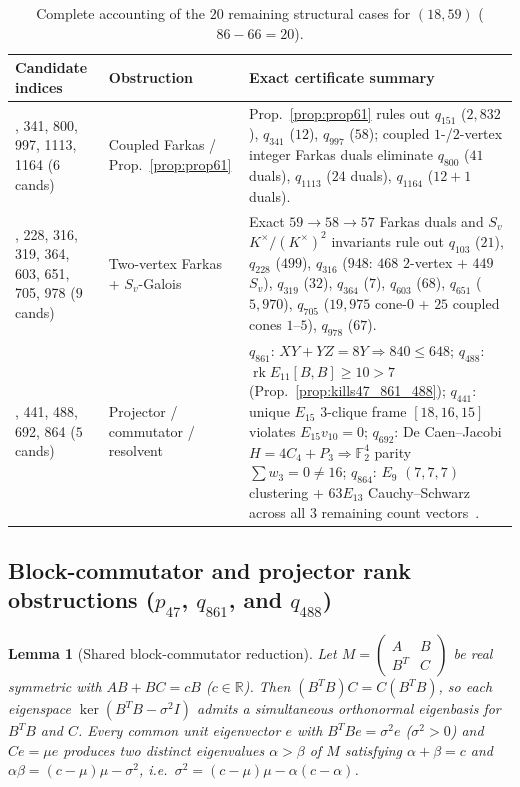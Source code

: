 \documentclass[11pt,reqno]{amsart}
\newtheorem{lemma}[theorem]{Lemma}
\theoremstyle{definition}
\theoremstyle{remark}
\DeclareMathOperator{\rk}{rk}
\begin{document}
\begin{table}[htbp]
\centering
\caption{Complete accounting of the $20$ remaining structural cases for $(18, 59)$ ($86 - 66 = 20$).}\label{tab:surv18_59}
\scriptsize
\setlength{\tabcolsep}{3.5pt}
\begin{tabular}{@{}>{\raggedright\arraybackslash}p{1.25in}>{\raggedright\arraybackslash}p{1.15in}>{\raggedright\arraybackslash}p{3.45in}@{}}
\toprule
Candidate indices & Obstruction & Exact certificate summary \\
\midrule
151, 341, 800, 997, 1113, 1164 ($6$ cands) & Coupled Farkas / Prop.~\ref{prop:prop61} & Prop.~\ref{prop:prop61} rules out $q_{151}$ ($2{,}832$), $q_{341}$ ($12$), $q_{997}$ ($58$); coupled $1$-/$2$-vertex integer Farkas duals eliminate $q_{800}$ ($41$ duals), $q_{1113}$ ($24$ duals), $q_{1164}$ ($12+1$ duals). \\
103, 228, 316, 319, 364, 603, 651, 705, 978 ($9$ cands) & Two-vertex Farkas + $S_v$-Galois & Exact $59 \to 58 \to 57$ Farkas duals and $S_v$ $K^\times/(K^\times)^2$ invariants rule out $q_{103}$ ($21$), $q_{228}$ ($499$), $q_{316}$ ($948$: $468$ $2$-vertex + $449$ $S_v$), $q_{319}$ ($32$), $q_{364}$ ($7$), $q_{603}$ ($68$), $q_{651}$ ($5{,}970$), $q_{705}$ ($19{,}975$ cone-$0$ + $25$ coupled cones $1$--$5$), $q_{978}$ ($67$). \\
861, 441, 488, 692, 864 ($5$ cands) & Projector / commutator / resolvent & $q_{861}$: $XY+YZ=8Y \Rightarrow 840 \le 648$; $q_{488}$: $\rk E_{11}[B,B] \ge 10 > 7$ (Prop.~\ref{prop:kills47_861_488}); $q_{441}$: unique $E_{15}$ $3$-clique frame $[18,16,15]$ violates $E_{15}v_{10}=0$; $q_{692}$: De Caen--Jacobi $H = 4C_4+P_3 \Rightarrow \mathbb{F}_2^4$ parity $\sum w_3 = 0 \neq 16$; $q_{864}$: $E_9$ $(7,7,7)$ clustering + $63 E_{13}$ Cauchy--Schwarz across all $3$ remaining count vectors~\cite{CompanionFull}. \\
\bottomrule
\end{tabular}
\end{table}

\subsection{Block-commutator and projector rank obstructions (\texorpdfstring{$p_{47}$, $q_{861}$, and $q_{488}$}{p\_47, q\_861, and q\_488})}

\begin{lemma}[Shared block-commutator reduction]\label{lem:commutator}
Let $M = \left(\begin{smallmatrix} A & B \\ B^T & C \end{smallmatrix}\right)$ be real symmetric with $AB + BC = c B$ ($c \in \mathbb{R}$). Then $(B^T B) C = C (B^T B)$, so each eigenspace $\ker(B^T B - \sigma^2 I)$ admits a simultaneous orthonormal eigenbasis for $B^T B$ and $C$. Every common unit eigenvector $e$ with $B^T B e = \sigma^2 e$ ($\sigma^2 > 0$) and $C e = \mu e$ produces two distinct eigenvalues $\alpha > \beta$ of $M$ satisfying $\alpha + \beta = c$ and $\alpha\beta = (c - \mu)\mu - \sigma^2$, i.e.\ $\sigma^2 = (c - \mu)\mu - \alpha(c - \alpha)$.
\end{lemma}
\end{document}
